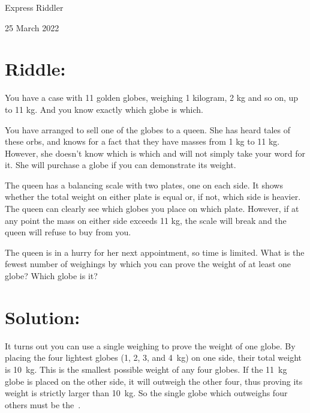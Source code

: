 \documentclass{article}
\begin{document}
\pagestyle{empty} %

\begin{center}
{\LARGE Express Riddler}

\vspace{0.15in}

{\Large 25 March 2022}
\end{center}


\section*{Riddle:}

You have a case with 11 golden globes, weighing 1 kilogram, 2 kg and so on, up to 11 kg.
And you know exactly which globe is which.

You have arranged to sell one of the globes to a queen.
She has heard tales of these orbs, and knows for a fact that they have masses from 1 kg to 11 kg.
However, she doesn't know which is which and will not simply take your word for it.
She will purchase a globe if you can demonstrate its weight.

The queen has a balancing scale with two plates, one on each side.
It shows whether the total weight on either plate is equal or, if not, which side is heavier.
The queen can clearly see which globes you place on which plate.
However, if at any point the mass on either side exceeds 11 kg, the scale will break and the queen will refuse to buy from you. 

The queen is in a hurry for her next appointment, so time is limited.
What is the fewest number of weighings by which you can prove the weight of at least one globe?
Which globe is it?


\section*{Solution:}

It turns out you can use a single weighing to prove the weight of one globe.
By placing the four lightest globes (1, 2, 3, and 4~kg) on one side, their total weight is 10~kg.
This is the smallest possible weight of any four globes.
If the 11~kg globe is placed on the other side, it will outweigh the other four, thus proving its weight is strictly larger than 10~kg.
So the single globe which outweighs four others must be the \,.
\end{document}
